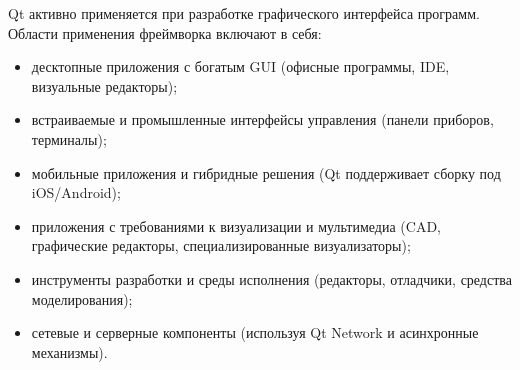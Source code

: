 Qt активно применяется при разработке графического интерфейса программ. Области применения фреймворка включают в себя:

\begin{itemize}
	\item десктопные приложения с богатым GUI (офисные программы, IDE, визуальные редакторы);
	\item встраиваемые и промышленные интерфейсы управления (панели приборов, терминалы);
	\item мобильные приложения и гибридные решения (Qt поддерживает сборку под iOS/Android);
	\item приложения с требованиями к визуализации и мультимедиа (CAD, графические редакторы, специализированные визуализаторы);
	\item инструменты разработки и среды исполнения (редакторы, отладчики, средства моделирования);
	\item сетевые и серверные компоненты (используя Qt Network и асинхронные механизмы).
\end{itemize}


 
